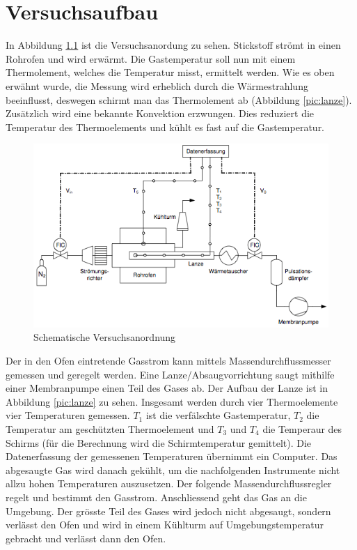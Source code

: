 \chapter{Versuchsaufbau}\label{sec:experimentalsetup}

In Abbildung \ref{pic:versuchsaufbau} ist die Versuchsanordung zu sehen. Stickstoff strömt in einen Rohrofen und wird erwärmt. Die Gastemperatur soll nun mit einem Thermolement, welches die Temperatur misst, ermittelt werden. Wie es oben erwähnt wurde, die Messung wird erheblich durch die Wärmestrahlung beeinflusst, deswegen schirmt man das Thermolement ab (Abbildung \ref{pic:lanze}). Zusätzlich wird eine bekannte Konvektion erzwungen. Dies reduziert die Temperatur des Thermoelements und kühlt es fast auf die Gastemperatur.\\

\begin{figure}[H]
\centering
\includegraphics[width=\textwidth]{pics/versuchsaufbau.png}
\caption{Schematische Versuchsanordnung}
\label{pic:versuchsaufbau}
\end{figure}

Der in den Ofen eintretende Gasstrom kann mittels Massendurchflussmesser gemessen und geregelt werden. Eine Lanze/Absaugvorrichtung saugt mithilfe einer Membranpumpe einen Teil des Gases ab. Der Aufbau der Lanze ist in Abbildung \ref{pic:lanze} zu sehen. Insgesamt werden durch vier Thermoelemente vier Temperaturen gemessen. $T_1$ ist die verfälschte Gastemperatur, $T_2$ die Temperatur am geschützten Thermoelement und $T_3$ und $T_4$ die Temperaur des Schirms (für die Berechnung wird die Schirmtemperatur gemittelt). Die Datenerfassung der gemessenen Temperaturen übernimmt ein Computer. Das abgesaugte Gas wird danach gekühlt, um die nachfolgenden Instrumente nicht allzu hohen Temperaturen auszusetzen. Der folgende Massendurchflussregler regelt und bestimmt den Gasstrom. Anschliessend geht das Gas an die Umgebung. Der grösste Teil des Gases wird jedoch nicht abgesaugt, sondern verlässt den Ofen und wird in einem Kühlturm auf Umgebungstemperatur gebracht und verlässt dann den Ofen. \\

